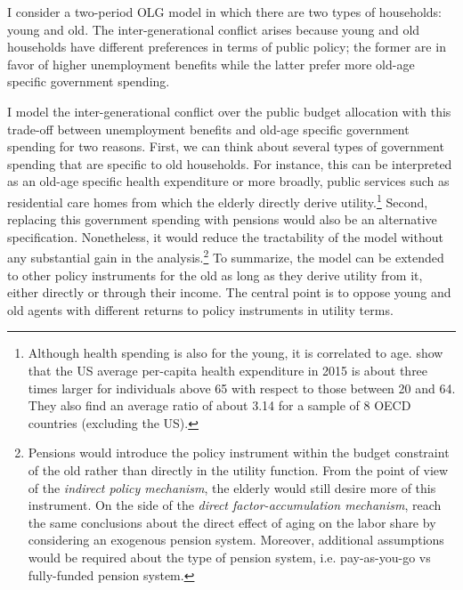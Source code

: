 I consider a two-period OLG model in which there are two types of households: young and old.
The inter-generational conflict arises because young and old households have different preferences in terms of public policy; the former are in favor of higher unemployment benefits while the latter prefer more old-age specific government spending.

I model the inter-generational conflict over the public budget allocation with this trade-off between unemployment benefits and old-age specific government spending for two reasons.
First, we can think about several types of government spending that are specific to old households. For instance, this can be interpreted as an old-age specific health expenditure or more broadly, public services such as residential care homes from which the elderly directly derive utility.\footnote{Although health spending is also for the young, it is correlated to age. \citet{Papanicolas2020Comparison} show that the US average per-capita health expenditure in 2015 is about three times larger for individuals above 65 with respect to those between 20 and 64. They also find an average ratio of about 3.14 for a sample of 8 OECD countries (excluding the US).}
Second, replacing this government spending with pensions would also be an alternative specification. Nonetheless, it would reduce the tractability of the model without any substantial gain in the analysis.\footnote{Pensions would introduce the policy instrument within the budget constraint of the old rather than directly in the utility function. From the point of view of the \textit{indirect policy mechanism}, the elderly would still desire more of this instrument. On the side of the \textit{direct factor-accumulation mechanism}, \citet{Schmidt2013Demographic} reach the same conclusions about the direct effect of aging on the labor share by considering an exogenous pension system. Moreover, additional assumptions would be required about the type of pension system, i.e. pay-as-you-go vs fully-funded pension system.}
To summarize, the model can be extended to other policy instruments for the old as long as they derive utility from it, either directly or through their income. The central point is to oppose young and old agents with different returns to policy instruments in utility terms.

